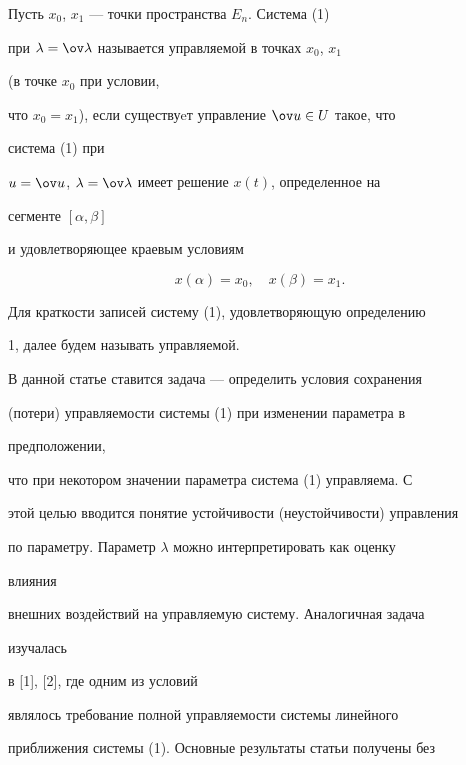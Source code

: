  


\begin{defn} 


Пусть $x_0$, $x_1$ --- точки пространства $E_n$. Система (1) 


при $\lambda=\ov\lambda$ называется управляемой в точках $x_0$, $x_1$ 


(в точке $x_0$ при условии, 


что $x_0=x_1$), если существуeт управление $\ov u\in U$ такое, что 


система (1) при 


$u=\ov u$, $\lambda=\ov\lambda$ имеет решение $x(t)$, определенное на 


сегменте $[\alpha,\beta]$ 


и удовлетворяющее краевым условиям 


\begin{equation} 


x(\alpha)=x_0,\quad x(\beta)=x_1. 


\end{equation} 


\end{defn} 


 


Для краткости записей систему (1), удовлетворяющую определению 


1, далее будем называть управляемой. 


 


В данной статье ставится задача --- определить условия сохранения 


(потери) управляемости системы (1) при изменении параметра в 


предположении, 


что при некотором значении параметра система (1) управляема. С 


этой целью вводится понятие устойчивости (неустойчивости) управления 


по параметру. Параметр $\lambda$ можно интерпретировать как оценку 


влияния 


внешних воздействий на управляемую систему. Аналогичная задача 


изучалась 


в [1], [2], где одним из условий 


являлось требование полной управляемости системы линейного 


приближения системы (1). Основные результаты статьи получены без 


